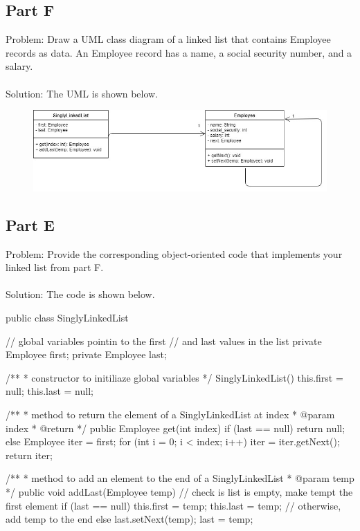 \documentclass{article}
\begin{document}
\subsection*{Part F}
Problem: Draw a UML class diagram of a linked list that contains Employee records as data. An Employee record has a name, a social security number, and a salary. \\\\
Solution: The UML is shown below.
\begin{figure}[h]
	\centering
	\includegraphics[width=5in]{hw3-linked-list.jpg}
\end{figure}

\subsection*{Part E}
Problem: Provide the corresponding object-oriented code that implements your linked list from part F. \\\\
Solution: The code is shown below.
\begin{spverbatim}
public class SinglyLinkedList {
	
    // global variables pointin to the first
    // and last values in the list
    private Employee first;
    private Employee last;
	
    /**
    * constructor to initiliaze global variables
    */
    SinglyLinkedList(){
        this.first = null;
        this.last = null;
    }
	
    /**
    * method to return the element of a SinglyLinkedList at index
    * @param index
    * @return 
    */
    public Employee get(int index){
        if (last == null){ return null; }
        else{
            Employee iter = first;
            for (int i = 0; i < index; i++){ iter = iter.getNext(); }
            return iter;
        }
    }
	
    /**
    * method to add an element to the end of a SinglyLinkedList
    * @param temp 
    */
    public void addLast(Employee temp){
        // check is list is empty, make tempt the first element
        if (last == null){
            this.first = temp;
            this.last = temp;
        }
        // otherwise, add temp to the end
        else{
            last.setNext(temp);
            last = temp;
        }
    }
	
}
\end{spverbatim}
\end{document}
